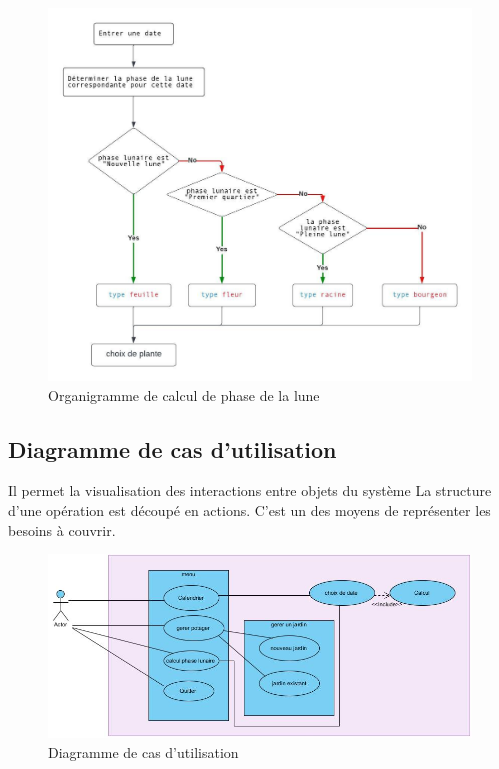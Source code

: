 \begin{figure}[H]
    	\center
    		\includegraphics[width=1\textwidth]{image/org}
   		\caption{Organigramme de calcul de phase de la lune}
    	\label{Organigramme de calcul de phase de la lune}
	\end{figure}
\subsection{Diagramme de cas d'utilisation}
Il permet la visualisation des interactions entre objets du système La structure d’une opération est découpé en actions. C’est un des moyens de représenter les besoins à couvrir.\\
\begin{figure}[!h]
    	\center
    		\includegraphics[width=1\textwidth]{image/diagrame2/Diagramme_utilisation.jpg}
   		\caption{Diagramme de cas d'utilisation}
    	\label{Diagramme de cas d'utilisation}
	\end{figure}


